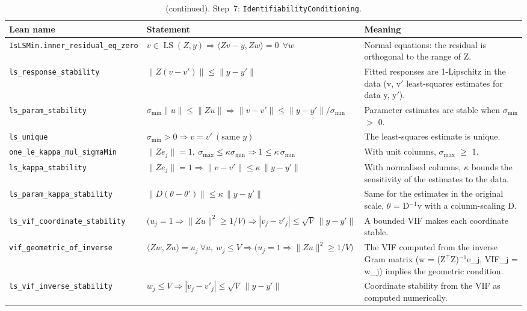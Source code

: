 \addtocounter{table}{-1}
{\small
\begin{longtable}{@{}>{\raggedright\arraybackslash}p{3.6cm}>{\raggedright\arraybackslash}p{6.6cm}>{\raggedright\arraybackslash}p{5.6cm}@{}}
\caption[]{(continued). Step~7: \texttt{IdentifiabilityConditioning}.}\\
\toprule
Lean name & Statement & Meaning \\
\midrule
\endhead
\texttt{IsLSMin.\allowbreak{}inner\_\allowbreak{}residual\_\allowbreak{}eq\_\allowbreak{}zero} & $\displaystyle v\in\operatorname{LS}(Z,y)\Rightarrow\langle Zv-y,Zw\rangle=0\ \ \forall w$ & Normal equations: the residual is orthogonal to the range of Z. \\[3pt]
\texttt{ls\_\allowbreak{}response\_\allowbreak{}stability} & $\displaystyle \|Z(v-v')\|\le\|y-y'\|$ & Fitted responses are 1-Lipschitz in the data (v, v$'$ least-squares estimates for data y, y$'$). \\[3pt]
\texttt{ls\_\allowbreak{}param\_\allowbreak{}stability} & $\displaystyle \sigma_{\min}\|u\|\le\|Zu\|\Rightarrow\|v-v'\|\le\|y-y'\|/\sigma_{\min}$ & Parameter estimates are stable when $\sigma_{\min}$ $>$ 0. \\[3pt]
\texttt{ls\_\allowbreak{}unique} & $\displaystyle \sigma_{\min}>0\Rightarrow v=v'\ (\text{same }y)$ & The least-squares estimate is unique. \\[3pt]
\texttt{one\_\allowbreak{}le\_\allowbreak{}kappa\_\allowbreak{}mul\_\allowbreak{}sigmaMin} & $\displaystyle \|Ze_j\|=1,\ \sigma_{\max}\le\kappa\sigma_{\min}\Rightarrow1\le\kappa\,\sigma_{\min}$ & With unit columns, $\sigma_{\max}$ $\ge$ 1. \\[3pt]
\texttt{ls\_\allowbreak{}kappa\_\allowbreak{}stability} & $\displaystyle \|Ze_j\|=1\Rightarrow\|v-v'\|\le\kappa\,\|y-y'\|$ & With normalised columns, $\kappa$ bounds the sensitivity of the estimates to the data. \\[3pt]
\texttt{ls\_\allowbreak{}param\_\allowbreak{}kappa\_\allowbreak{}stability} & $\displaystyle \|D(\theta-\theta')\|\le\kappa\,\|y-y'\|$ & Same for the estimates in the original scale, $\theta$ = D$^{-1}$v with a column-scaling D. \\[3pt]
\texttt{ls\_\allowbreak{}vif\_\allowbreak{}coordinate\_\allowbreak{}stability} & $\displaystyle \bigl(u_j=1\Rightarrow\|Zu\|^2\ge1/V\bigr)\Rightarrow|v_j-v'_j|\le\sqrt V\,\|y-y'\|$ & A bounded VIF makes each coordinate stable. \\[3pt]
\texttt{vif\_\allowbreak{}geometric\_\allowbreak{}of\_\allowbreak{}inverse} & $\displaystyle \langle Zw,Zu\rangle=u_j\ \forall u,\ w_j\le V\Rightarrow\bigl(u_j=1\Rightarrow\|Zu\|^2\ge1/V\bigr)$ & The VIF computed from the inverse Gram matrix (w = (Z$^\top$Z)$^{-1}$e\_j, VIF\_j = w\_j) implies the geometric condition. \\[3pt]
\texttt{ls\_\allowbreak{}vif\_\allowbreak{}inverse\_\allowbreak{}stability} & $\displaystyle w_j\le V\Rightarrow|v_j-v'_j|\le\sqrt V\,\|y-y'\|$ & Coordinate stability from the VIF as computed numerically. \\[3pt]
\bottomrule
\end{longtable}
}

